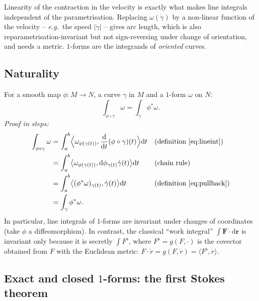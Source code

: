 \documentclass[11pt,a4paper]{article}
\numberwithin{equation}{section}
\theoremstyle{definition}
\theoremstyle{plain}
\newcommand{\dd}{\mathrm{d}}
\newcommand{\pb}{{}^{*}}                            %
\newcommand{\eg}{\emph{e.g.}\ }
\begin{document}
\begin{keyidea}
Linearity of the contraction in the velocity is exactly what makes line integrals independent of the parametrisation. Replacing $\omega(\dot\gamma)$ by a non-linear function of the velocity -- \eg the speed $|\dot\gamma|$ -- gives arc length,
which is also reparametrisation-invariant but not sign-reversing under change of orientation, and needs a metric. $1$-forms are the integrands of \emph{oriented} curves.
\end{keyidea}

\subsection{Naturality}\label{sec:naturality}

For a smooth map $\phi:M\to N$, a curve $\gamma$ in $M$ and a $1$-form $\omega$ on $N$:
\begin{equation}\label{eq:natural}
\int_{\phi\circ\gamma}\omega=\int_\gamma\phi\pb\omega .
\end{equation}
\emph{Proof in steps:}
\begin{align*}
\int_{\phi\circ\gamma}\omega&=\int_a^b\Bigl\langle\omega_{\phi(\gamma(t))},\frac{\dd}{\dd t}(\phi\circ\gamma)(t)\Bigr\rangle\dd t &&\text{(definition \eqref{eq:lineint})}\\
&=\int_a^b\bigl\langle\omega_{\phi(\gamma(t))},\dd\phi_{\gamma(t)}\dot\gamma(t)\bigr\rangle\dd t &&\text{(chain rule)}\\
&=\int_a^b\bigl\langle(\phi\pb\omega)_{\gamma(t)},\dot\gamma(t)\bigr\rangle\dd t &&\text{(definition \eqref{eq:pullback})}\\
&=\int_\gamma\phi\pb\omega .
\end{align*}
In particular, line integrals of $1$-forms are invariant under changes of coordinates (take $\phi$ a diffeomorphism). In contrast, the classical ``work integral'' $\int\mathbf F\cdot\dd\mathbf r$ is invariant only because it is secretly $\int F^\flat$, where $F^\flat=g(F,\cdot)$ is the covector obtained from $F$ with the Euclidean metric: $F\cdot\dot r=g(F,\dot r)=\langle F^\flat,\dot r\rangle$.

\subsection{Exact and closed $1$-forms: the first Stokes theorem}\label{sec:expl-closed}
\end{document}

